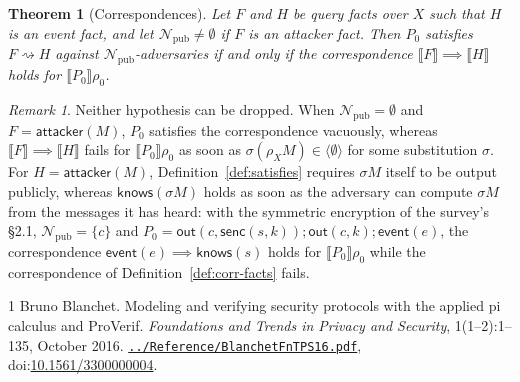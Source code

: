 \documentclass[11pt]{article}
\theoremstyle{definition}
\theoremstyle{plain}
\newtheorem{theorem}[definition]{Theorem}
\theoremstyle{remark}
\newtheorem{remark}[definition]{Remark}
\newcommand{\sem}[1]{\llbracket #1 \rrbracket}
\begin{document}
\begin{theorem}[Correspondences]\label{thm:corr}
Let $F$ and $H$ be query facts over $X$ such that $H$ is an event fact, and let $\mathcal{N}_{\mathrm{pub}}\ne\emptyset$ if $F$ is an attacker fact. Then $P_0$ satisfies $F\rightsquigarrow H$ against $\mathcal{N}_{\mathrm{pub}}$-adversaries if and only if the correspondence $\sem{F}\implies\sem{H}$ holds for $\sem{P_0}\rho_0$.
\end{theorem}

\begin{remark}
Neither hypothesis can be dropped. When $\mathcal{N}_{\mathrm{pub}}=\emptyset$ and $F=\mathsf{attacker}(M)$, $P_0$ satisfies the correspondence vacuously, whereas $\sem{F}\implies\sem{H}$ fails for $\sem{P_0}\rho_0$ as soon as $\sigma(\rho_XM)\in\langle\emptyset\rangle$ for some substitution $\sigma$. For $H=\mathsf{attacker}(M)$, Definition~\ref{def:satisfies} requires $\sigma M$ itself to be output publicly, whereas $\mathsf{knows}(\sigma M)$ holds as soon as the adversary can compute $\sigma M$ from the messages it has heard: with the symmetric encryption of the survey's \S2.1, $\mathcal{N}_{\mathrm{pub}}=\{c\}$ and $P_0=\mathsf{out}(c,\mathsf{senc}(s,k));\mathsf{out}(c,k);\mathsf{event}(e)$, the correspondence $\mathsf{event}(e)\implies\mathsf{knows}(s)$ holds for $\sem{P_0}\rho_0$ while the correspondence of Definition~\ref{def:corr-facts} fails.
\end{remark}

\begin{thebibliography}{1}
Bruno Blanchet.
\newblock Modeling and verifying security protocols with the applied pi calculus and {ProVerif}.
\newblock \textit{Foundations and Trends in Privacy and Security}, 1(1--2):1--135, October 2016.
\newblock \href{file:../Reference/BlanchetFnTPS16.pdf}{\texttt{../Reference/BlanchetFnTPS16.pdf}},
doi:\href{https://doi.org/10.1561/3300000004}{10.1561/3300000004}.
\end{thebibliography}
\end{document}
